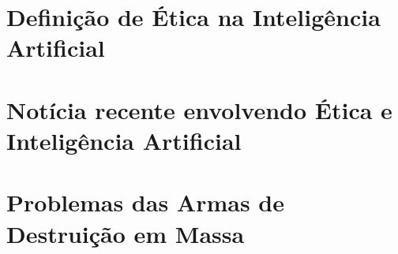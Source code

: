 \documentclass{article}
\begin{document}
\section{Definição de Ética na Inteligência Artificial}


\section{Notícia recente envolvendo Ética e Inteligência Artificial}


\section{Problemas das Armas de Destruição em Massa}
%
%
\end{document}
